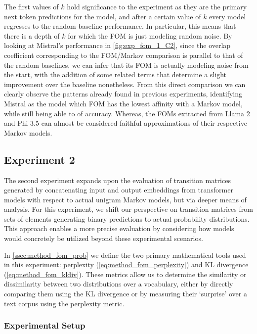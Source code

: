 The first values of $k$ hold  significance to the experiment as they are the primary next token predictions for the model, and after a certain value of $k$ every model regresses to the random baseline performance.
In particular, this means that there is a depth of $k$ for which the FOM is just modeling random noise.
By looking at Mistral's performance in \cref{fig:exp_fom_1_C2}, since the overlap coefficient corresponding to the FOM/Markov comparison is parallel to that of the random baselines, we can infer that its FOM is actually modeling noise from the start, with the addition of some related terms that determine a slight improvement over the baseline nonetheless.
From this direct comparison we can clearly observe the patterns already found in previous experiments, identifying Mistral as the model which FOM has the lowest affinity with a Markov model, while still being able to  of accuracy.
Whereas, the FOMs extracted from Llama 2 and Phi 3.5 can almost be considered faithful approximations of their respective Markov models.

\subsection{Experiment 2}\label{ssec:exp_fom_exp2}

The second experiment expands upon the evaluation of transition matrices generated by concatenating input and output embeddings from transformer models with respect to actual unigram Markov models, but via deeper means of analysis.
For this experiment, we shift our perspective on transition matrices from sets of elements generating binary predictions to actual probability distributions.
This approach enables a more precise evaluation by considering how models would concretely be utilized beyond these experimental scenarios.

In \cref{ssec:method_fom_prob} we define the two primary mathematical tools used in this experiment: perplexity (\cref{eq:method_fom_perplexity}) and KL divergence (\cref{eq:method_fom_kldiv}).
These metrics allow us to determine the similarity or dissimilarity between two distributions over a vocabulary, either by directly comparing them using the KL divergence or by measuring their `surprise' over a text corpus using the perplexity metric. 

\subsubsection{Experimental Setup}

